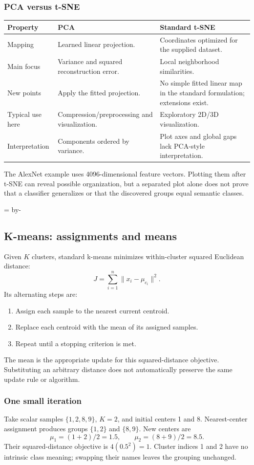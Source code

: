 \documentclass[11pt]{article}
\newcommand{\newsubsection}[1]{\par\begingroup\skip0=\pagegoal\advance\skip0 by-\pagetotal\ifdim\skip0<12\baselineskip\newpage\fi\endgroup\subsection{#1}}
\begin{document}
\subsubsection{PCA versus t-SNE}
\begin{longtable}{@{}P{.25\textwidth}P{.32\textwidth}P{.33\textwidth}@{}}
\toprule Property & PCA & Standard t-SNE\\\midrule\endhead
Mapping & Learned linear projection. & Coordinates optimized for the supplied dataset.\\
Main focus & Variance and squared reconstruction error. & Local neighborhood similarities.\\
New points & Apply the fitted projection. & No simple fitted linear map in the standard formulation; extensions exist.\\
Typical use here & Compression/preprocessing and visualization. & Exploratory 2D/3D visualization.\\
Interpretation & Components ordered by variance. & Plot axes and global gaps lack PCA-style interpretation.\\\bottomrule
\end{longtable}
The AlexNet example uses 4096-dimensional feature vectors. Plotting them after t-SNE can reveal possible organization, but a separated plot alone does not prove that a classifier generalizes or that the discovered groups equal semantic classes.

\newsubsection{K-means: assignments and means}
Given $K$ clusters, standard k-means minimizes within-cluster squared Euclidean distance:
\[
J=\sum_{i=1}^{n}\|x_i-\mu_{c_i}\|^2.
\]
Its alternating steps are:
\begin{enumerate}
\item Assign each sample to the nearest current centroid.
\item Replace each centroid with the mean of its assigned samples.
\item Repeat until a stopping criterion is met.
\end{enumerate}
The mean is the appropriate update for this squared-distance objective. Substituting an arbitrary distance does not automatically preserve the same update rule or algorithm.

\subsubsection{One small iteration}
Take scalar samples $\{1,2,8,9\}$, $K=2$, and initial centers 1 and 8. Nearest-center assignment produces groups $\{1,2\}$ and $\{8,9\}$. New centers are
\[
\mu_1=(1+2)/2=1.5,\qquad \mu_2=(8+9)/2=8.5.
\]
Their squared-distance objective is $4(0.5^2)=1$. Cluster indices 1 and 2 have no intrinsic class meaning; swapping their names leaves the grouping unchanged.
\end{document}
